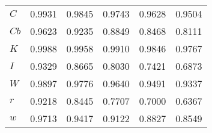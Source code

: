 \begin{center}
\begin{longtable}{lccccc}
$C         $	 & 	    0.9931	 & 	    0.9845	 & 	    0.9743	 & 	    0.9628	 & 	    0.9504 \\ 
$Cb        $	 & 	    0.9623	 & 	    0.9235	 & 	    0.8849	 & 	    0.8468	 & 	    0.8111 \\ 
$K         $	 & 	    0.9988	 & 	    0.9958	 & 	    0.9910	 & 	    0.9846	 & 	    0.9767 \\ 
$I         $	 & 	    0.9329	 & 	    0.8665	 & 	    0.8030	 & 	    0.7421	 & 	    0.6873 \\ 
$W         $	 & 	    0.9897	 & 	    0.9776	 & 	    0.9640	 & 	    0.9491	 & 	    0.9337 \\ 
$r         $	 & 	    0.9218	 & 	    0.8445	 & 	    0.7707	 & 	    0.7000	 & 	    0.6367 \\ 
$w         $	 & 	    0.9713	 & 	    0.9417	 & 	    0.9122	 & 	    0.8827	 & 	    0.8549 \\ 
\end{longtable}
 \end{center}
